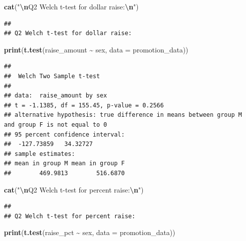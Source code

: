 \documentclass[
]{article}
\newenvironment{Shaded}{\begin{snugshade}}{\end{snugshade}}
\newcommand{\AttributeTok}[1]{\textcolor[rgb]{0.13,0.29,0.53}{#1}}
\newcommand{\FunctionTok}[1]{\textcolor[rgb]{0.13,0.29,0.53}{\textbf{#1}}}
\newcommand{\NormalTok}[1]{#1}
\newcommand{\SpecialCharTok}[1]{\textcolor[rgb]{0.81,0.36,0.00}{\textbf{#1}}}
\newcommand{\StringTok}[1]{\textcolor[rgb]{0.31,0.60,0.02}{#1}}
\begin{document}
\begin{Shaded}
\begin{Highlighting}[]
\FunctionTok{cat}\NormalTok{(}\StringTok{"}\SpecialCharTok{\textbackslash{}n}\StringTok{Q2 Welch t{-}test for dollar raise:}\SpecialCharTok{\textbackslash{}n}\StringTok{"}\NormalTok{)}
\end{Highlighting}
\end{Shaded}

\begin{verbatim}
## 
## Q2 Welch t-test for dollar raise:
\end{verbatim}

\begin{Shaded}
\begin{Highlighting}[]
\FunctionTok{print}\NormalTok{(}\FunctionTok{t.test}\NormalTok{(raise\_amount }\SpecialCharTok{\textasciitilde{}}\NormalTok{ sex, }\AttributeTok{data =}\NormalTok{ promotion\_data))}
\end{Highlighting}
\end{Shaded}

\begin{verbatim}
## 
##  Welch Two Sample t-test
## 
## data:  raise_amount by sex
## t = -1.1385, df = 155.45, p-value = 0.2566
## alternative hypothesis: true difference in means between group M and group F is not equal to 0
## 95 percent confidence interval:
##  -127.73859   34.32727
## sample estimates:
## mean in group M mean in group F 
##        469.9813        516.6870
\end{verbatim}

\begin{Shaded}
\begin{Highlighting}[]
\FunctionTok{cat}\NormalTok{(}\StringTok{"}\SpecialCharTok{\textbackslash{}n}\StringTok{Q2 Welch t{-}test for percent raise:}\SpecialCharTok{\textbackslash{}n}\StringTok{"}\NormalTok{)}
\end{Highlighting}
\end{Shaded}

\begin{verbatim}
## 
## Q2 Welch t-test for percent raise:
\end{verbatim}

\begin{Shaded}
\begin{Highlighting}[]
\FunctionTok{print}\NormalTok{(}\FunctionTok{t.test}\NormalTok{(raise\_pct }\SpecialCharTok{\textasciitilde{}}\NormalTok{ sex, }\AttributeTok{data =}\NormalTok{ promotion\_data))}
\end{Highlighting}
\end{Shaded}
\end{document}
